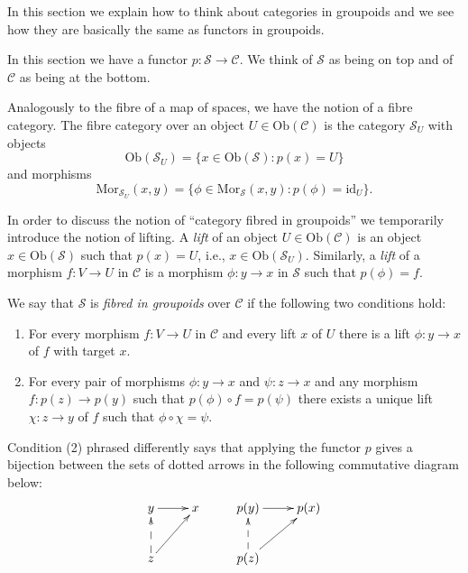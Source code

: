 \noindent
In this section we explain how to think about categories in groupoids
and we see how they are basically the same as functors in groupoids.

\medskip\noindent
In this section we have a functor $p : \mathcal{S} \to \mathcal{C}$.
We think of $\mathcal{S}$ as being on top and of $\mathcal{C}$ as being
at the bottom.

\medskip\noindent
Analogously to the fibre of a map of spaces, we have the notion of a 
fibre category. The fibre category over an object 
$U\in \text{Ob}(\mathcal{C})$ is the category $\mathcal{S}_U$ with 
objects
$$
\text{Ob}(\mathcal{S}_U) = \{x\in \text{Ob}(\mathcal{S}) :
p(x)=U\}
$$
and morphisms 
$$
\text{Mor}_{\mathcal{S}_U}(x,y) = \{ \phi \in \text{Mor}_\mathcal{S}(x,y) :
p(\phi) = \text{id}_U\}.
$$

\medskip\noindent
In order to discuss the notion of ``category fibred in groupoids'' we
temporarily introduce the notion of lifting.
A {\it lift} of an object $U \in \text{Ob}(\mathcal{C})$ is an object 
$x\in \text{Ob}(\mathcal{S})$ such that $p(x)=U$, i.e., 
$x\in \text{Ob}(\mathcal{S}_U)$.  
Similarly, a {\it lift} of a morphism $f : V \to U$ in $\mathcal{C}$ is a 
morphism $\phi : y \to x$ in $\mathcal{S}$ such that $p(\phi)=f$.

\begin{definition}
\label{definition-fibred-groupoids}
We say that $\mathcal{S}$ is {\it fibred in groupoids} over $\mathcal{C}$ if
the following two conditions hold:
\begin{enumerate}
\item For every morphism $f : V \to U$ in $\mathcal{C}$ and every
lift $x$ of $U$ there is a lift $\phi : y \to x$ of $f$ with
target $x$.
\item For every pair of morphisms $ \phi : y \to x$ and $ \psi : z \to x$
and any morphism $ f : p(z) \to p(y)$ such that $ p(\phi) \circ f = 
p(\psi)$ there exists a unique lift $ \chi : z \to y$ of $f$ such that
$\phi \circ \chi = \psi$.
\end{enumerate}
\end{definition}

\noindent
Condition (2) phrased differently says that 
applying the functor $p$ gives a bijection between the sets 
of dotted arrows in the following commutative diagram below:
$$
\xymatrix{
y \ar[r] & x & p(y) \ar[r] & p(x) \\
z \ar@{-->}[u] \ar[ru] & & p(z) \ar@{-->}[u]\ar[ru] & \\
}
$$

